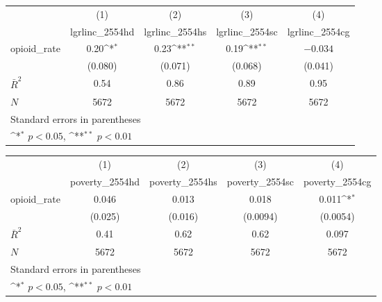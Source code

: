 {
\def\sym#1{\ifmmode^{#1}\else\(^{#1}\)\fi}
\begin{tabular}{l*{4}{c}}
\hline\hline
            &\multicolumn{1}{c}{(1)}&\multicolumn{1}{c}{(2)}&\multicolumn{1}{c}{(3)}&\multicolumn{1}{c}{(4)}\\
            &\multicolumn{1}{c}{lgrlinc\_2554hd}&\multicolumn{1}{c}{lgrlinc\_2554hs}&\multicolumn{1}{c}{lgrlinc\_2554sc}&\multicolumn{1}{c}{lgrlinc\_2554cg}\\
\hline
opioid\_rate &        0.20\sym{*} &        0.23\sym{**}&        0.19\sym{**}&      $-0.034$        \\
            &     (0.080)        &     (0.071)        &     (0.068)        &     (0.041)        \\
\hline
$\bar{R}^2$ &        0.54        &        0.86        &        0.89        &        0.95        \\
$N$         &        5672        &        5672        &        5672        &        5672        \\
\hline\hline
\multicolumn{5}{l}{\footnotesize Standard errors in parentheses}\\
\multicolumn{5}{l}{\footnotesize \sym{*} \(p<0.05\), \sym{**} \(p<0.01\)}\\
\end{tabular}
}
{
\def\sym#1{\ifmmode^{#1}\else\(^{#1}\)\fi}
\begin{tabular}{l*{4}{c}}
\hline\hline
            &\multicolumn{1}{c}{(1)}&\multicolumn{1}{c}{(2)}&\multicolumn{1}{c}{(3)}&\multicolumn{1}{c}{(4)}\\
            &\multicolumn{1}{c}{poverty\_2554hd}&\multicolumn{1}{c}{poverty\_2554hs}&\multicolumn{1}{c}{poverty\_2554sc}&\multicolumn{1}{c}{poverty\_2554cg}\\
\hline
opioid\_rate &       0.046        &       0.013        &       0.018        &       0.011\sym{*} \\
            &     (0.025)        &     (0.016)        &    (0.0094)        &    (0.0054)        \\
\hline
$\bar{R}^2$ &        0.41        &        0.62        &        0.62        &       0.097        \\
$N$         &        5672        &        5672        &        5672        &        5672        \\
\hline\hline
\multicolumn{5}{l}{\footnotesize Standard errors in parentheses}\\
\multicolumn{5}{l}{\footnotesize \sym{*} \(p<0.05\), \sym{**} \(p<0.01\)}\\
\end{tabular}
}

